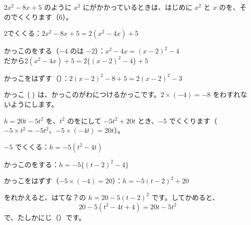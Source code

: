 $2x^2-8x+5$ のように $x^2$ にがかかっているときは、はじめに $x^2$ と $x$ のを、そのでくくります（6）。
\begin{enumerate}[label={\bkcircled[bkOrange]{\arabic*}}, leftmargin=2.4\zw, itemsep=2pt, topsep=3pt]
\item 2でくくる：\quad $2x^2-8x+5=2(x^2-4x)+5$
\item かっこのをする（$-4$ のは $-2$）：\quad $x^2-4x=(x-2)^2-4$\\
だから\quad $2(x^2-4x)+5=2\{(x-2)^2-4\}+5$
\item かっこをはずす（）：\quad $2(x-2)^2-8+5=2(x-2)^2-3$
\end{enumerate}
かっこ $\{\ \}$ は、かっこのがわにつけるかっこです。$2\times(-4)=-8$ をわすれないようにします。

$h=20t-5t^2$ を、$t^2$ のをにして $-5t^2+20t$ とき、$-5$ でくくります（$-5\times t^2=-5t^2$、$-5\times(-4t)=20t$）。
\begin{enumerate}[label={\bkcircled[bkOrange]{\arabic*}}, leftmargin=2.4\zw, itemsep=2pt, topsep=3pt]
\item $-5$ でくくる：\quad $h=-5(t^2-4t)$
\item かっこのをする：\quad $h=-5\{(t-2)^2-4\}$
\item かっこをはずす（$-5\times(-4)=20$）：\quad $h=-5(t-2)^2+20$
\end{enumerate}
をれかえると、はてな？の $h=20-5(t-2)^2$ です。してかめると、
\[ 20-5(t^2-4t+4)=20t-5t^2 \]
で、たしかにじ（）です。

